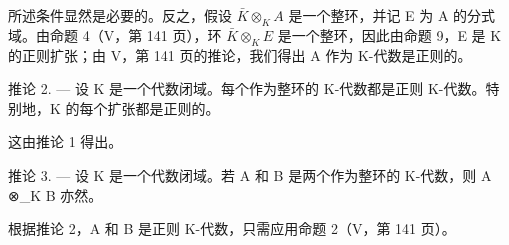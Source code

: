 所述条件显然是必要的。反之，假设 \(\bar{K} \otimes_{K} A\) 是一个整环，并记 E 为 A 的分式域。由命题 4（V，第 141 页），环 \(\bar{K} \otimes_{K} E\) 是一个整环，因此由命题 9，E 是 K 的正则扩张；由 V，第 141 页的推论，我们得出 A 作为 K-代数是正则的。

推论 2. --- 设 K 是一个代数闭域。每个作为整环的 K-代数都是正则 K-代数。特别地，K 的每个扩张都是正则的。

这由推论 1 得出。

推论 3. --- 设 K 是一个代数闭域。若 A 和 B 是两个作为整环的 K-代数，则 A ⊗\_K B 亦然。

根据推论 2，A 和 B 是正则 K-代数，只需应用命题 2（V，第 141 页）。

